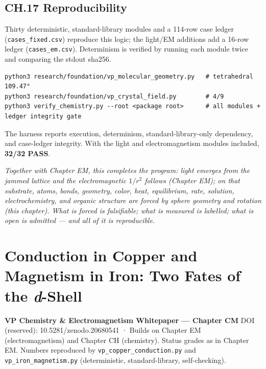 \documentclass[
  10pt,
]{article}
\begin{document}
\hypertarget{ch.17-reproducibility}{%
\subsection{CH.17 Reproducibility}\label{ch.17-reproducibility}}

Thirty deterministic, standard-library modules and a 114-row case ledger
(\texttt{cases\_fixed.csv}) reproduce this logic; the light/EM additions
add a 16-row ledger (\texttt{cases\_em.csv}). Determinism is verified by
running each module twice and comparing the stdout sha256.

\begin{verbatim}
python3 research/foundation/vp_molecular_geometry.py   # tetrahedral 109.47°
python3 research/foundation/vp_crystal_field.py        # 4/9
python3 verify_chemistry.py --root <package root>      # all modules + ledger integrity gate
\end{verbatim}

The harness reports execution, determinism, standard-library-only
dependency, and case-ledger integrity. With the light and
electromagnetism modules included, \textbf{32/32 PASS}.

\emph{Together with Chapter EM, this completes the program: light
emerges from the jammed lattice and the electromagnetic \(1/r^2\)
follows (Chapter EM); on that substrate, atoms, bonds, geometry, color,
heat, equilibrium, rate, solution, electrochemistry, and organic
structure are forced by sphere geometry and rotation (this chapter).
What is forced is falsifiable; what is measured is labelled; what is
open is admitted --- and all of it is reproducible.}

\hypertarget{conduction-in-copper-and-magnetism-in-iron-two-fates-of-the-d-shell}{%
\section{\texorpdfstring{Conduction in Copper and Magnetism in Iron: Two
Fates of the
\emph{d}-Shell}{Conduction in Copper and Magnetism in Iron: Two Fates of the d-Shell}}\label{conduction-in-copper-and-magnetism-in-iron-two-fates-of-the-d-shell}}

\textbf{VP Chemistry \& Electromagnetism Whitepaper --- Chapter CM} DOI
(reserved): 10.5281/zenodo.20680541 · Builds on Chapter EM
(electromagnetism) and Chapter CH (chemistry). Status grades as in
Chapter EM. Numbers reproduced by \texttt{vp\_copper\_conduction.py} and
\texttt{vp\_iron\_magnetism.py} (deterministic, standard-library,
self-checking).
\end{document}
